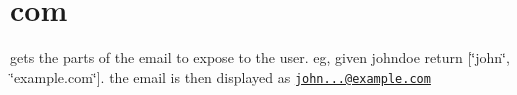 \hypertarget{com-example}{\section{com}
}
gets the parts of the email to expose to the user. eg, given johndoe return \mbox{[}\char`\"{}john\char`\"{}, \char`\"{}example.\-com\char`\"{}\mbox{]}. the email is then displayed as \href{mailto:john...@example.com}{\tt john...@example.\-com}


\begin{DoxyCodeInclude}
\end{DoxyCodeInclude}
 